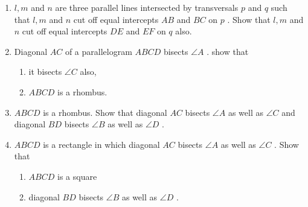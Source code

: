 \begin{enumerate}[label=\thesection.\arabic*.,ref=\thesection.\theenumi]
\begin{enumerate}
\end{enumerate}
%
\item $l, m$ and $n$ are three parallel lines intersected by transversals $p$ and $q$ such that $l, m$ and $n$ cut off equal intercepts $AB$ and $BC$ on $p$ . Show that $l, m$ and $n$ cut off equal intercepts $DE$ and $EF$ on $q$ also.
%
\item Diagonal $AC$ of a parallelogram $ABCD$ bisects $\angle A$ . show that 
\begin{enumerate}
\item it bisects  $\angle C$  also, 
\item $ABCD$ is a rhombus.
\end{enumerate}
%
\item $ABCD$ is a rhombus. Show that diagonal $AC$ bisects $\angle A$ as well as  $\angle C$  and diagonal $BD$ bisects  $\angle B$  as well as  $\angle D$ .
\item $ABCD$ is a rectangle in which diagonal $AC$ bisects $\angle A$ as well as  $\angle C$ . Show that 
\begin{enumerate}
\item $ABCD$ is a square 
\item diagonal $BD$ bisects  $\angle B$  as well as  $\angle D$ .
%
\end{enumerate}


\end{enumerate}
